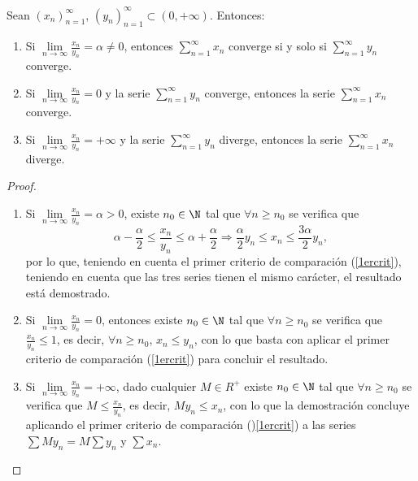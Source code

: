 \begin{theorem}
	Sean \((x_n)^{\infty}_{n=1} \), \((y_n)^{\infty}_{n=1} \subset (0,+\infty) \). Entonces:
	\begin{enumerate}
		\item Si \(\lim\limits_{n \to \infty} \frac{x_n }{y_n } = \alpha \neq 0 \), entonces \(\sum_{n=1}^{\infty} x_n \) converge si y solo si \(\sum_{n=1}^{\infty} y_n \) converge.
		\item Si \(\lim\limits_{n \to \infty} \frac{x_n }{y_n }= 0 \) y la serie \(\sum_{n=1}^{\infty} y_n \) converge, entonces la serie \(\sum_{n =1}^{\infty} x_n \) converge.
		\item Si \(\lim\limits_{n \to \infty} \frac{x_n }{y_n }= + \infty \) y la serie \(\sum_{n =1}^{\infty} y_n \) diverge, entonces la serie \(\sum_{n =1}^{\infty} x_n \) diverge.
	\end{enumerate}
\end{theorem}
\begin{proof}

	\begin{enumerate}
		\item Si \(\lim\limits_{n \to \infty} \frac{x_n }{y_n } = \alpha > 0\), existe \(n_0 \in \N\) tal que \(\forall n \geq n_0\) se verifica que
		      \[
			      \alpha - \frac{\alpha}{2} \leq \frac{x_n }{y_n } \leq \alpha + \frac{\alpha}{2} \Rightarrow \frac{\alpha}{2} y_n \leq x_n \leq \frac{3\alpha}{2} y_n,
		      \]
		      por lo que, teniendo en cuenta el primer criterio de comparación (\ref{1ercrit}), teniendo en cuenta que las tres series tienen el mismo carácter, el resultado está demostrado.
		\item Si \(\lim\limits_{n \to \infty} \frac{x_n }{y_n } = 0\), entonces existe \(n_0 \in \N\) tal que \(\forall n \geq n_0 \) se verifica que \(\frac{x_n }{y_n} \leq 1\), es decir, \(\forall n \geq n_0\), \(x_n \leq y_n\), con lo que basta con aplicar el primer criterio de comparación (\ref{1ercrit}) para concluir el resultado.
		\item Si \(\lim\limits_{n \to \infty} \frac{x_n }{y_n } = +\infty\), dado cualquier \(M \in R^{+}\) existe \(n_0 \in \N \) tal que \(\forall n \geq  n_0\) se verifica que \(M \leq \frac{x_n }{y_n }\), es decir, \(My_n \leq x_n \), con lo que la demostración concluye aplicando el primer criterio de comparación ()\ref{1ercrit}) a las series \(\sum M y_n = M \sum y_n \) y \(\sum x_n\).
	\end{enumerate}
\end{proof}
